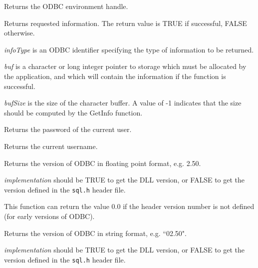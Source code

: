 

Returns the ODBC environment handle. 
  



Returns requested information. The return value is TRUE if successful, FALSE otherwise.

{\it infoType} is an ODBC identifier specifying the type of information to be returned.

{\it buf} is a character or long integer pointer to storage which must be allocated by the
application, and which will contain the information if the function is successful.

{\it bufSize} is the size of the character buffer. A value of -1 indicates that the size
should be computed by the GetInfo function.



Returns the password of the current user.



Returns the current username.



Returns the version of ODBC in floating point format, e.g. 2.50.

{\it implementation} should be TRUE to get the DLL version, or FALSE to get the
version defined in the {\tt sql.h} header file.

This function can return the value 0.0 if the header version number is not defined (for early
versions of ODBC).



Returns the version of ODBC in string format, e.g. ``02.50".

{\it implementation} should be TRUE to get the DLL version, or FALSE to get the
version defined in the {\tt sql.h} header file.


